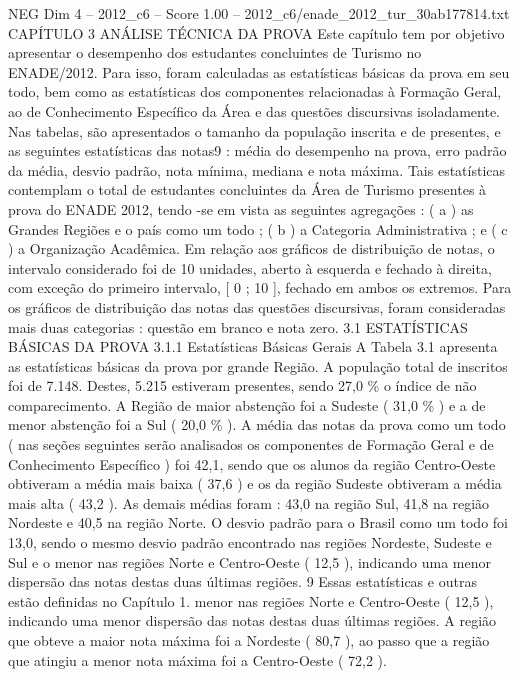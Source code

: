 \begin{textsample}{NEG Dim 4 – 2012\_c6 – Score 1.00 – 2012\_c6/enade\_2012\_tur\_30ab177814.txt}  \label{ex:f4_neg_231}
CAPÍTULO 3 ANÁLISE TÉCNICA DA PROVA Este capítulo tem por objetivo apresentar o desempenho dos estudantes concluintes de Turismo no ENADE/2012.
Para isso, foram calculadas as estatísticas básicas da prova em seu todo, bem como as estatísticas dos componentes relacionadas à Formação Geral, ao de Conhecimento Específico da Área e das questões discursivas isoladamente.
Nas tabelas, são apresentados o tamanho da população inscrita e de presentes, e as seguintes estatísticas das notas9 : média do desempenho na prova, erro padrão da média, desvio padrão, nota mínima, mediana e nota máxima.
Tais estatísticas contemplam o total de estudantes concluintes da Área de Turismo presentes à prova do ENADE 2012, tendo -se em vista as seguintes agregações : ( a ) as Grandes Regiões e o país como um todo ; ( b ) a Categoria Administrativa ; e ( c ) a Organização Acadêmica.
Em relação aos gráficos de distribuição de notas, o intervalo considerado foi de 10 unidades, aberto à esquerda e fechado à direita, com exceção do primeiro intervalo, [ 0 ; 10 ], fechado em ambos os extremos.
Para os gráficos de distribuição das notas das questões discursivas, foram consideradas mais duas categorias : questão em branco e nota zero. 3.1 ESTATÍSTICAS BÁSICAS DA PROVA 3.1.1 Estatísticas Básicas Gerais A Tabela 3.1 apresenta as estatísticas básicas da prova por grande Região.
A população total de inscritos foi de 7.148.
Destes, 5.215 estiveram presentes, sendo 27,0 \% o índice de não comparecimento.
A Região de maior abstenção foi a Sudeste ( 31,0 \% ) e a de menor abstenção foi a Sul ( 20,0 \% ).
A média das notas da prova como um todo ( nas seções seguintes serão analisados os componentes de Formação Geral e de Conhecimento Específico ) foi 42,1, sendo que os alunos da região Centro-Oeste obtiveram a média mais baixa ( 37,6 ) e os da região Sudeste obtiveram a média mais alta ( 43,2 ).
As demais médias foram : 43,0 na região Sul, 41,8 na região Nordeste e 40,5 na região Norte.
O desvio padrão para o Brasil como um todo foi 13,0, sendo o mesmo desvio padrão encontrado nas regiões Nordeste, Sudeste e Sul e o menor nas regiões Norte e Centro-Oeste ( 12,5 ), indicando uma menor dispersão das notas destas duas últimas regiões. 9 Essas estatísticas e outras estão definidas no Capítulo 1. menor nas regiões Norte e Centro-Oeste ( 12,5 ), indicando uma menor dispersão das notas destas duas últimas regiões.
A região que obteve a maior nota máxima foi a Nordeste ( 80,7 ), ao passo que a região que atingiu a menor nota máxima foi a Centro-Oeste ( 72,2 ).

\end{textsample}
